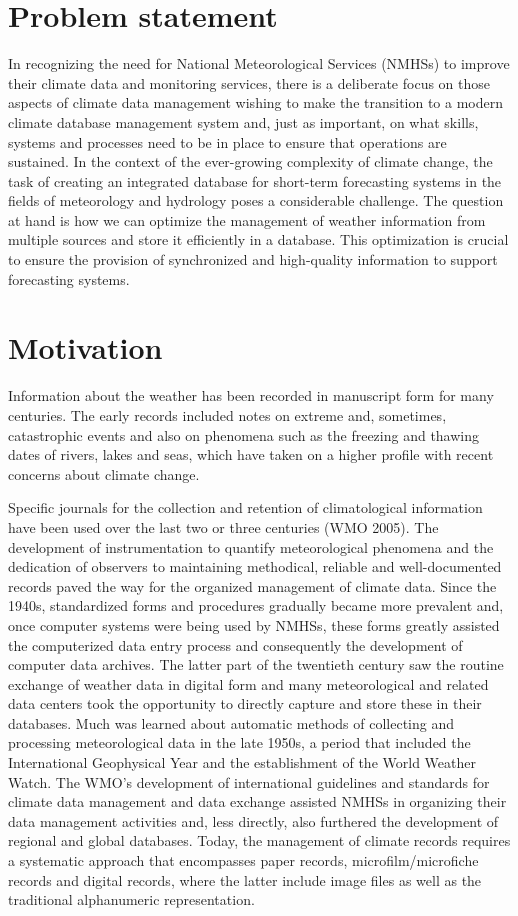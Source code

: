 \section{Problem statement}

In recognizing the need for National Meteorological Services (NMHSs) to improve
their climate data and monitoring services, there is a deliberate focus on those
aspects of climate data management wishing to make the transition to a modern
climate database management system and, just as important, on what skills,
systems and processes need to be in place to ensure that operations are
sustained. In the context of the ever-growing complexity of climate change, the
task of creating an integrated database for short-term forecasting systems in
the fields of meteorology and hydrology poses a considerable challenge. The
question at hand is how we can optimize the management of weather information
from multiple sources and store it efficiently in a database. This optimization
is crucial to ensure the provision of synchronized and high-quality information
to support forecasting systems.

\section{Motivation}


Information about the weather has been recorded in manuscript form for many
centuries. The early records included notes on extreme and, sometimes,
catastrophic events and also on phenomena such as the freezing and thawing dates
of rivers, lakes and seas, which have taken on a higher profile with recent
concerns about climate change.

Specific journals for the collection and retention of climatological information
have been used over the last two or three centuries (WMO 2005). The development
of instrumentation to quantify meteorological phenomena and the dedication of
observers to maintaining methodical, reliable and well-documented records paved
the way for the organized management of climate data. Since the 1940s,
standardized forms and procedures gradually became more prevalent and, once
computer systems were being used by NMHSs, these forms greatly assisted the
computerized data entry process and consequently the development of computer
data archives. The latter part of the twentieth century saw the routine exchange
of weather data in digital form and many meteorological and related data centers
took the opportunity to directly capture and store these in their databases.
Much was learned about automatic methods of collecting and processing
meteorological data in the late 1950s, a period that included the International
Geophysical Year and the establishment of the World Weather Watch. The WMO’s
development of international guidelines and standards for climate data
management and data exchange assisted NMHSs in organizing their data management
activities and, less directly, also furthered the development of regional and
global databases. Today, the management of climate records requires a systematic
approach that encompasses paper records, microfilm/microfiche records and
digital records, where the latter include image files as well as the traditional
alphanumeric representation.


